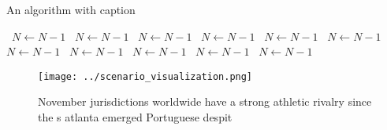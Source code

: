 \documentclass[a4paper]{article}
\begin{document}
\begin{algorithm}
\caption{An algorithm with caption}
\begin{algorithmic}
\    \State $N \gets N - 1$
\    \State $N \gets N - 1$
\    \State $N \gets N - 1$
\    \State $N \gets N - 1$
\    \State $N \gets N - 1$
\    \State $N \gets N - 1$
\    \State $N \gets N - 1$
\    \State $N \gets N - 1$
\    \State $N \gets N - 1$
\    \State $N \gets N - 1$
\    \State $N \gets N - 1$
\EndWhile
\end{algorithmic}
\end{algorithm}

\begin{figure}
\centering
\texttt{[image: ../scenario\_visualization.png]}
\caption{November jurisdictions worldwide have a strong athletic rivalry since the s atlanta emerged Portuguese despit
}
\end{figure}
 
\end{document}
